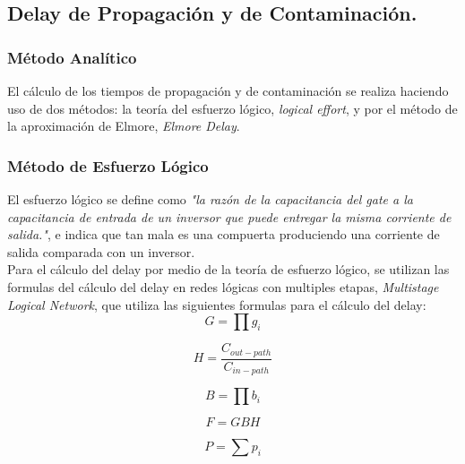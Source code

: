 \documentclass[12pt,a4paper]{article} %
\begin{document}
\subsection{Delay de Propagación y de Contaminación.}

\subsubsection{Método Analítico}

El cálculo de los tiempos de propagación y de contaminación se realiza haciendo uso de dos métodos: la teoría del esfuerzo lógico, \textit{logical effort}, y por el método de la aproximación de Elmore, \textit{Elmore Delay}.\\

\subsubsection{Método de Esfuerzo Lógico}

El esfuerzo lógico se define como \textit{"la razón de la capacitancia del gate a la capacitancia de entrada de un inversor que puede entregar la misma corriente de salida."}, e indica que tan mala es una compuerta produciendo una corriente de salida comparada con un inversor.\\

Para el cálculo del delay por medio de la teoría de esfuerzo lógico, se utilizan las formulas del cálculo del delay en redes lógicas con multiples etapas, \textit{Multistage Logical Network}, que utiliza las siguientes formulas para el cálculo del delay:\\

\begin{equation}\label{eqn:esfuerzo_logico}
G= \prod g_{i}
\end{equation}

\begin{equation}\label{eqn:esfuerzo_electrico}
H= \frac{C_{out-path}}{C_{in-path}}
\end{equation}

\begin{equation}\label{eqn:esfuerzo_enramado}
B= \prod b_{i}
\end{equation}

\begin{equation}\label{eqn:esfuerzo}
F = GBH
\end{equation}

\begin{equation}\label{eqn:delay_parasitico}
P = \sum p_{i}
\end{equation}
\end{document}
